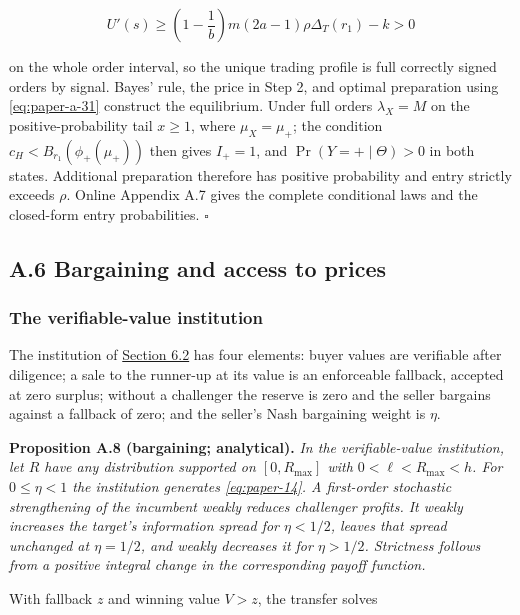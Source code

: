 \documentclass[
  12pt,
]{article}
\begin{document}
\[
U'(s)\ge\left(1-\frac1b\right)m(2a-1)\rho\Delta_T(r_1)-k>0
\tag{A.37}\label{eq:paper-a-37}
\]

on the whole order interval, so the unique trading profile is full
correctly signed orders by signal. Bayes' rule, the price in Step 2, and
optimal preparation using \eqref{eq:paper-a-31} construct the
equilibrium. Under full orders \(\lambda_X=M\) on the
positive-probability tail \(x\ge1\), where \(\mu_X=\mu_+\); the
condition \(c_H<B_{r_1}(\phi_+(\mu_+))\) then gives \(I_+=1\), and
\(\Pr(Y=+\mid\Theta)>0\) in both states. Additional preparation
therefore has positive probability and entry strictly exceeds \(\rho\).
Online Appendix A.7 gives the complete conditional laws and the
closed-form entry probabilities. \(\square\)

\subsection{A.6 Bargaining and access to prices}\label{pa-welfare}

\subsubsection{The verifiable-value
institution}\label{the-verifiable-value-institution}

The institution of \hyperref[sec-the-payment-rule]{Section 6.2} has four
elements: buyer values are verifiable after diligence; a sale to the
runner-up at its value is an enforceable fallback, accepted at zero
surplus; without a challenger the reserve is zero and the seller
bargains against a fallback of zero; and the seller's Nash bargaining
weight is \(\eta\).


\protect{}\label{result-proposition-a-8}{\textbf{Proposition
A.8 (bargaining; analytical).}} \emph{In the verifiable-value
institution, let \(R\) have any distribution supported on
\([0,R_{\max}]\) with \(0<\ell<R_{\max}<h\). For \(0\le\eta<1\) the
institution generates \eqref{eq:paper-14}. A first-order stochastic
strengthening of the incumbent weakly reduces challenger profits. It
weakly increases the target's information spread for \(\eta<1/2\),
leaves that spread unchanged at \(\eta=1/2\), and weakly decreases it
for \(\eta>1/2\). Strictness follows from a positive integral change in
the corresponding payoff function.}

With fallback \(z\) and winning value \(V>z\), the transfer solves
\end{document}

